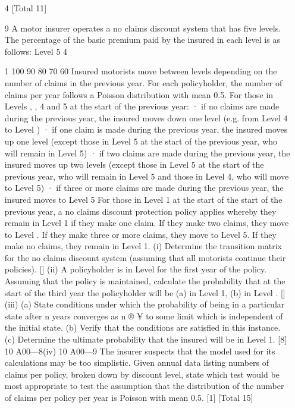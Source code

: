 \documentclass[a4paper,1pt]{article}
\begin{document}
\begin{enumerate}
\item
[4]
[Total 11]

9
A motor insurer operates a no claims discount system that has five levels. The
percentage of the basic premium paid by the insured in each level is as follows:
Level %
5
4


1 100
90
80
70
60
Insured motorists move between levels depending on the number of claims in the
previous year. For each policyholder, the number of claims per year follows a
Poisson distribution with mean 0.5.
For those in Levels , , 4 and 5 at the start of the previous year:
· if no claims are made during the previous year, the insured moves down one
level (e.g. from Level 4 to Level )
· if one claim is made during the previous year, the insured moves up one level
(except those in Level 5 at the start of the previous year, who will remain in
Level 5)
· if two claims are made during the previous year, the insured moves up two
levels (except those in Level 5 at the start of the previous year, who will
remain in Level 5 and those in Level 4, who will move to Level 5)
· if three or more claims are made during the previous year, the insured moves
to Level 5
For those in Level 1 at the start of the start of the previous year, a no claims discount
protection policy applies whereby they remain in Level 1 if they make one claim. If
they make two claims, they move to Level . If they make three or more claims, they
move to Level 5. If they make no claims, they remain in Level 1.
(i) Determine the transition matrix for the no claims discount system (assuming
that all motorists continue their policies).
[]
(ii) A policyholder is in Level  for the first year of the policy. Assuming that the
policy is maintained, calculate the probability that at the start of the third year
the policyholder will be (a) in Level 1, (b) in Level .
[]
(iii) (a)
State conditions under which the probability of being in a particular
state after n years converges as n ® ¥ to some limit which is
independent of the initial state.
(b)
Verify that the conditions are satisfied in this instance.
(c)
Determine the ultimate probability that the insured will be in Level 1.
[8]
10 A00—8(iv)
10 A00—9
The insurer suspects that the model used for its calculations may be too
simplistic. Given annual data listing numbers of claims per policy, broken
down by discount level, state which test would be most appropriate to test the
assumption that the distribution of the number of claims per policy per year is
Poisson with mean 0.5.
[1]
[Total 15]












\end{enumerate}
\end{document}
